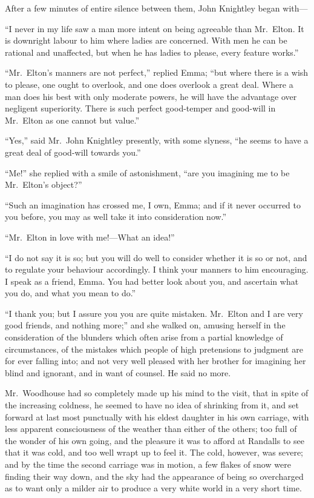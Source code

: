 After a few minutes of entire silence between them, John Knightley
began with---%

``I never in my life saw a man more intent on being agreeable than
Mr.\ Elton.  It is downright labour to him where ladies are concerned.
With men he can be rational and unaffected, but when he has ladies
to please, every feature works.''

``Mr.\ Elton's manners are not perfect,'' replied Emma; ``but where there
is a wish to please, one ought to overlook, and one does overlook
a great deal.  Where a man does his best with only moderate powers,
he will have the advantage over negligent superiority.  There is
such perfect good-temper and good-will in Mr.\ Elton as one cannot
but value.''

``Yes,'' said Mr.\ John Knightley presently, with some slyness,
``he seems to have a great deal of good-will towards you.''

``Me!'' she replied with a smile of astonishment, ``are you imagining
me to be Mr.\ Elton's object?''

``Such an imagination has crossed me, I own, Emma; and if it never
occurred to you before, you may as well take it into consideration now.''

``Mr.\ Elton in love with me!---What an idea!''

``I do not say it is so; but you will do well to consider whether
it is so or not, and to regulate your behaviour accordingly.
I think your manners to him encouraging.  I speak as a friend,
Emma.  You had better look about you, and ascertain what you do,
and what you mean to do.''

``I thank you; but I assure you you are quite mistaken.  Mr.\ Elton
and I are very good friends, and nothing more;'' and she walked on,
amusing herself in the consideration of the blunders which often
arise from a partial knowledge of circumstances, of the mistakes
which people of high pretensions to judgment are for ever falling into;
and not very well pleased with her brother for imagining her blind
and ignorant, and in want of counsel.  He said no more.

Mr.\ Woodhouse had so completely made up his mind to the visit,
that in spite of the increasing coldness, he seemed to have no idea
of shrinking from it, and set forward at last most punctually
with his eldest daughter in his own carriage, with less apparent
consciousness of the weather than either of the others; too full
of the wonder of his own going, and the pleasure it was to afford at
Randalls to see that it was cold, and too well wrapt up to feel it.
The cold, however, was severe; and by the time the second carriage
was in motion, a few flakes of snow were finding their way down,
and the sky had the appearance of being so overcharged as to want only
a milder air to produce a very white world in a very short time.


